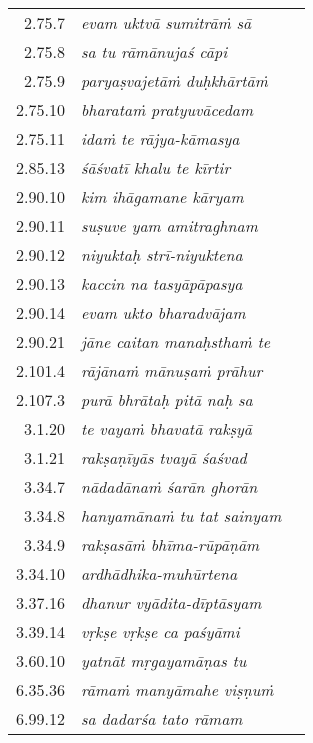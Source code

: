 {\begin{longtable}{rlc}
2.75.7 & {\sl evam uktvā sumitrāṁ sā} & \pageref{verse20}\\
2.75.8 & {\sl sa tu rāmānujaś cāpi} & \pageref{verse21}\\
2.75.9 & {\sl paryaṣvajetāṁ duḥkhārtāṁ} & \pageref{verse22}\\
2.75.10 & {\sl bharataṁ pratyuvācedam} & \pageref{verse23}\\
2.75.11 & {\sl idaṁ te rājya-kāmasya} & \pageref{verse24}\\
2.85.13 & {\sl śāśvatī khalu te kīrtir} & \pageref{verse25}\\
2.90.10 & {\sl kim ihāgamane kāryam} & \pageref{verse28}\\
2.90.11 & {\sl suṣuve yam amitraghnam} & \pageref{verse29}\\
2.90.12 & {\sl niyuktaḥ strī-niyuktena} & \pageref{verse30}\\
2.90.13 & {\sl kaccin na tasyāpāpasya} & \pageref{verse31}\\
2.90.14 & {\sl evam ukto bharadvājam} & \pageref{verse26}\\
2.90.21 & {\sl jāne caitan manaḥsthaṁ te} & \pageref{verse27}\\
2.101.4 & {\sl rājānaṁ mānuṣaṁ prāhur} & \pageref{verse32}\\
2.107.3 & {\sl purā bhrātaḥ pitā naḥ sa} & \pageref{verse33}\\
3.1.20 & {\sl te vayaṁ bhavatā rakṣyā} & \pageref{verse34}\\
3.1.21 & {\sl rakṣaṇīyās tvayā śaśvad} & \pageref{verse35}\\
3.34.7 & {\sl nādadānaṁ śarān ghorān} & \pageref{verse36}\\
3.34.8 & {\sl hanyamānaṁ tu tat sainyam} & \pageref{verse37}\\
3.34.9 & {\sl rakṣasāṁ bhīma-rūpāṇām} & \pageref{verse38}\\
3.34.10 & {\sl ardhādhika-muhūrtena} & \pageref{verse39}\\
3.37.16 & {\sl dhanur vyādita-dīptāsyam} & \pageref{verse40}\\
3.39.14 & {\sl vṛkṣe vṛkṣe ca paśyāmi} & \pageref{verse41}\\
3.60.10 & {\sl yatnāt mṛgayamāṇas tu} & \pageref{verse42}\\
6.35.36 & {\sl rāmaṁ manyāmahe viṣṇuṁ} & \pageref{verse43}\\
6.99.12 & {\sl sa dadarśa tato rāmam} & \pageref{verse44}
\end{longtable}}

